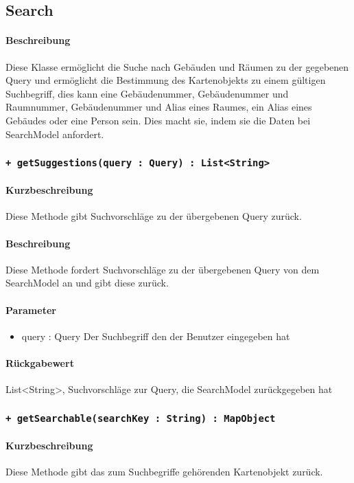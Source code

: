 \subsection{Search}
\paragraph*{Beschreibung}
Diese Klasse ermöglicht die Suche nach Gebäuden und Räumen zu der gegebenen Query 
und ermöglicht die Bestimmung des Kartenobjekts zu einem gültigen Suchbegriff, 
dies kann eine Gebäudenummer, Gebäudenummer und Raumnummer, Gebäudenummer und Alias eines Raumes, ein Alias eines Gebäudes oder eine Person sein.
Dies macht sie, indem sie die Daten bei SearchModel anfordert.

\subsubsection{\texttt{+ getSuggestions(query : Query) : List<String>}}%
\paragraph*{Kurzbeschreibung}
Diese Methode gibt Suchvorschläge zu der übergebenen Query zurück.
\paragraph*{Beschreibung}
Diese Methode fordert Suchvorschläge zu der übergebenen Query von dem SearchModel an und gibt diese zurück.
\paragraph*{Parameter}
\begin{itemize}
    \item query : Query Der Suchbegriff den der Benutzer eingegeben hat
\end{itemize}
\paragraph*{Rückgabewert}
List<String>, Suchvorschläge zur Query, die SearchModel zurückgegeben hat

\subsubsection{\texttt{+ getSearchable(searchKey : String) : MapObject}}%
\paragraph*{Kurzbeschreibung}
Diese Methode gibt das zum Suchbegriffe gehörenden Kartenobjekt zurück.
